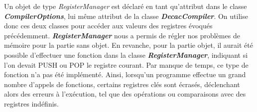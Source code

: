 \documentclass{article}
\begin{document}
\begin{itemize}
\noindent Un objet de type \textit{RegisterManager} est déclaré en tant qu'attribut dans le classe \textit{\textbf{CompilerOptions}}, lui même attribut
de la classe \textit{\textbf{DecacCompiler}}. On utilise donc ces deux classes pour accéder
aux valeurs des registres évoqués précédemment.\newline
\textbf{\textit{RegisterManager}} nous a permis de régler nos problèmes de mémoire pour la partie sans objet. 
En revanche, pour la partie objet, il aurait été possible d'effectuer une fonction dans la classe \textbf{\textit{RegisterManager}}, indiquant si l'on devait PUSH ou POP le registre courant.
Par manque de temps, ce type de fonction n'a pas été implémenté. Ainsi, lorsqu'un programme effectue un grand nombre d'appels de fonctions, certains registres clés sont écrasés, déclenchant alors des erreurs à l'exécution, tel que des opérations ou comparaisons avec des registres indéfinis.


\end{itemize}
\end{document}
